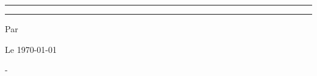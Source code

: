\begin{titlepage}
    \centering
    
    \vspace*{2cm}
    {\color{blue}\rule{\textwidth}{1.5pt}}\par
    \vspace{1cm}
    
    {\Huge\bfseries \myTitle \par}
    \vspace{0.5cm}
    {\Large \docName \par}
    
    \vspace{1cm}
    {\color{blue}\rule{0.6\textwidth}{1pt}}\par
    \vspace{2cm}
    
    {\Large Par \myAuthor \par}
    \vspace{0.5cm}
    {\Large Le \today \par}
    
    \vfill
    
    
    \vspace{1cm}
    {\large {\myLesson} - {\myClass} \par}
    {\large {\mySchool} \par}
    \vspace*{2cm}
\end{titlepage}